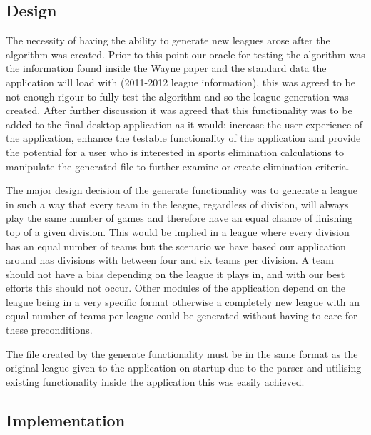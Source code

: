 \subsection{Design}
The necessity of having the ability to generate new leagues arose
after the algorithm was created. Prior to this point our oracle for
testing the algorithm was the information found inside the Wayne paper
\cite{Wayne} and the standard data the application will load with
(2011-2012 league information), this was agreed to be not enough
rigour to fully test the algorithm and so the league generation was
created. After further discussion it was agreed that this
functionality was to be added to the final desktop application as it
would: increase the user experience of the application, enhance the
testable functionality of the application and provide the potential
for a user who is interested in sports elimination calculations to
manipulate the generated file to further examine or create elimination
criteria.

The major design decision of the generate functionality was to
generate a league in such a way that every team in the league,
regardless of division, will always play the same number of games and
therefore have an equal chance of finishing top of a given
division. This would be implied in a league where every division has
an equal number of teams but the scenario we have based our
application around has divisions with between four and six teams per
division. A team should not have a bias depending on the league it
plays in, and with our best efforts this should not occur. Other
modules of the application depend on the league being in a very
specific format otherwise a completely new league with an equal number
of teams per league could be generated without having to care for
these preconditions. 

The file created by the generate functionality must be in the same
format as the original league given to the application on startup due
to the parser and utilising existing functionality inside the
application this was easily achieved.


\subsection{Implementation}
